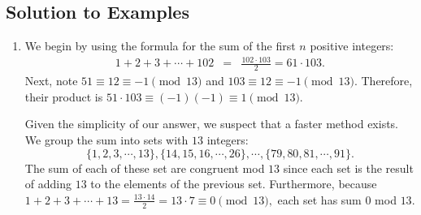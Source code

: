 \subsection{Solution to Examples}
\begin{enumerate}
	\item We begin by using the formula for the sum of the first $n$ positive integers: \begin{eqnarray*} 1+2+3+\cdots+102 &=& \frac{102\cdot 103}{2}=61\cdot 103. \end{eqnarray*}Next, note $51\equiv 12\equiv -1\pmod{13}$ and $103\equiv 12\equiv -1\pmod{13}$. 
	Therefore, their product is $51\cdot 103\equiv (-1)(-1)\equiv 1\pmod{13}$. 
	
	Given the simplicity of our answer, we suspect that a faster method exists.
\clearpage
	We group the sum into sets with $13$ integers: $$\{1,2,3,\cdots, 13\}, \{14, 15, 16, \cdots, 26\}, \cdots, \{79,80,81,\cdots,91\}.$$The sum of each of these set are congruent mod $13$ since each set is the result of adding $13$ to the elements of the previous set. Furthermore, because $1+2+3+\cdots+13=\frac{13\cdot 14}{2}=13\cdot 7\equiv 0\pmod{13},$ each set has sum \color{ForestGreen} $0$ mod $13$. \color{black}
	

\end{enumerate}
